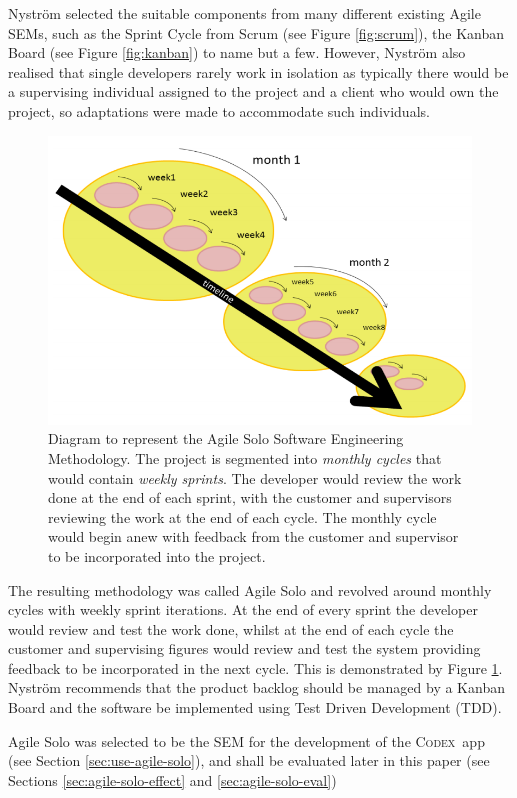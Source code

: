\documentclass[final]{cmpreport}
\newcommand{\Codex}{\textsc{Codex}}
\begin{document}
			Nystr{\"o}m selected the suitable components from many different existing Agile SEMs, such as the Sprint Cycle from Scrum (see Figure \ref{fig:scrum}), the Kanban Board (see Figure \ref{fig:kanban}) to name but a few. However, Nystr{\"o}m also realised that single developers rarely work in isolation as typically there would be a supervising individual assigned to the project and a client who would own the project, so adaptations were made to accommodate such individuals.
			
			\begin{figure}[H]
				\centering
				\includegraphics[width=0.8\linewidth]{agile-solo.png}
				\caption[Agile Solo Diagram]{Diagram to represent the Agile Solo Software Engineering Methodology. The project is segmented into \emph{monthly cycles} that would contain \emph{weekly sprints}. The developer would review the work done at the end of each sprint, with the customer and supervisors reviewing the work at the end of each cycle. The monthly cycle would begin anew with feedback from the customer and supervisor to be incorporated into the project.} \label{fig:agile-solo}
			\end{figure}
			
			The resulting methodology was called Agile Solo and revolved around monthly cycles with weekly sprint iterations. At the end of every sprint the developer would review and test the work done, whilst at the end of each cycle the customer and supervising figures would review and test the system providing feedback to be incorporated in the next cycle. This is demonstrated by Figure \ref{fig:agile-solo}. Nystr{\"o}m recommends that the product backlog should be managed by a Kanban Board and the software be implemented using Test Driven Development (TDD). 
			
			Agile Solo was selected to be the SEM for the development of the \Codex \ app (see Section \ref{sec:use-agile-solo}), and shall be evaluated later in this paper (see Sections \ref{sec:agile-solo-effect} and \ref{sec:agile-solo-eval})
			
\end{document}
